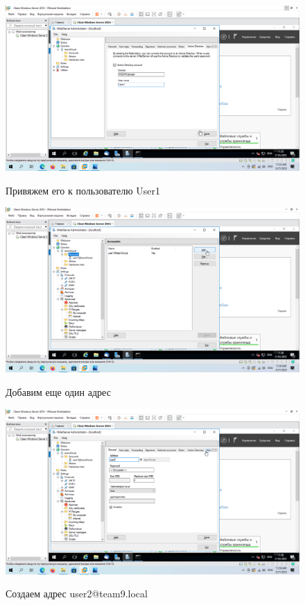 \documentclass[a4paper]{article}
\begin{document}
  \begin{figure}[H]
    \centering
    \includegraphics[width=\textwidth]{11_0138}
    \label{img:138}
    \caption{Привяжем его к пользователю User1}
  \end{figure}

  \begin{figure}[H]
    \centering
    \includegraphics[width=\textwidth]{11_0139}
    \label{img:139}
    \caption{Добавим еще один адрес}
  \end{figure}

  \begin{figure}[H]
    \centering
    \includegraphics[width=\textwidth]{11_0140}
    \label{img:140}
    \caption{Создаем адрес user2@team9.local}
  \end{figure}
\end{document}
